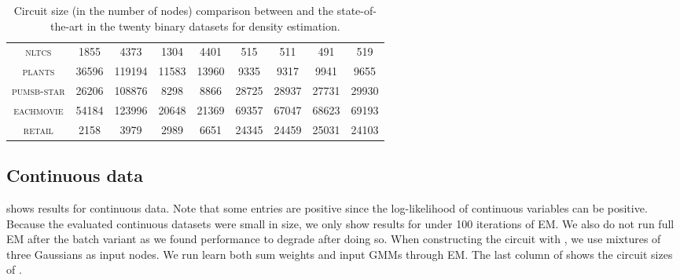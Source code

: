 \begin{table}[t]
{\begin{tabular}{c|cccc|cccc}
    \textsc{nltcs     } & 1855    & 4373    & 1304  & 4401    & 515       & 511     & 491     & 519     \\
    \textsc{plants    } & 36596   & 119194  & 11583 & 13960   & 9335      & 9317    & 9941    & 9655    \\
    \textsc{pumsb-star} & 26206   & 108876  & 8298  & 8866    & 28725     & 28937   & 27731   & 29930   \\
    \textsc{eachmovie } & 54184   & 123996  & 20648 & 21369   & 69357     & 67047   & 68623   & 69193   \\
    \textsc{retail    } & 2158    & 3979    & 2989  & 6651    & 24345     & 24459   & 25031   & 24103   \\
    \hline
  \end{tabular}
  }
  \caption{Circuit size (in the number of nodes) comparison between  and the
    state-of-the-art in the twenty binary datasets for density estimation.}
  \label{tab:binsize}
\end{table}

\subsection{Continuous data}

 shows results for continuous data. Note that some entries are positive since the
log-likelihood of continuous variables can be positive. Because the evaluated continuous datasets
were small in size, we only show results for  under 100 iterations of EM. We also
do not run full EM after the batch variant as we found performance to degrade after doing so. When
constructing the circuit with , we use mixtures of three Gaussians as input
nodes. We run learn both sum weights and input GMMs through EM. The last column of 
shows the circuit sizes of .

